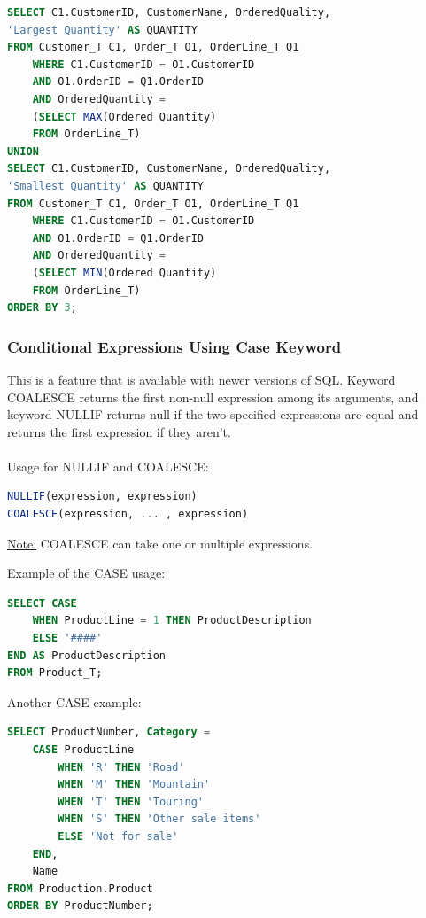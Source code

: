\documentclass[12pt]{article}
\begin{document}
\begin{lstlisting}[language=SQL]
SELECT C1.CustomerID, CustomerName, OrderedQuality, 
'Largest Quantity' AS QUANTITY
FROM Customer_T C1, Order_T O1, OrderLine_T Q1
	WHERE C1.CustomerID = O1.CustomerID
	AND O1.OrderID = Q1.OrderID
	AND OrderedQuantity =
	(SELECT MAX(Ordered Quantity)
	FROM OrderLine_T)
UNION
SELECT C1.CustomerID, CustomerName, OrderedQuality, 
'Smallest Quantity' AS QUANTITY
FROM Customer_T C1, Order_T O1, OrderLine_T Q1
	WHERE C1.CustomerID = O1.CustomerID
	AND O1.OrderID = Q1.OrderID
	AND OrderedQuantity =
	(SELECT MIN(Ordered Quantity)
	FROM OrderLine_T)
ORDER BY 3;
\end{lstlisting}

\subsubsection{Conditional Expressions Using Case Keyword}

This is a feature that is available with newer versions of SQL. Keyword COALESCE returns the first non-null expression among its arguments, and keyword NULLIF returns null if the two specified expressions are equal and returns the first expression if they aren't.\\
\\
Usage for NULLIF and COALESCE:
\begin{lstlisting}[language=SQL]
NULLIF(expression, expression)
COALESCE(expression, ... , expression)
\end{lstlisting}

\begin{tcolorbox}
	\underline{Note:} COALESCE can take one or multiple expressions.
\end{tcolorbox}

Example of the CASE usage:\\
\begin{lstlisting}[language=SQL]
SELECT CASE
	WHEN ProductLine = 1 THEN ProductDescription
	ELSE '####'
END AS ProductDescription
FROM Product_T;
\end{lstlisting}

Another CASE example:\\
\begin{lstlisting}[language=SQL]
SELECT ProductNumber, Category =
	CASE ProductLine
		WHEN 'R' THEN 'Road'
		WHEN 'M' THEN 'Mountain'
		WHEN 'T' THEN 'Touring'
		WHEN 'S' THEN 'Other sale items'
		ELSE 'Not for sale'
	END,
	Name
FROM Production.Product
ORDER BY ProductNumber;
\end{lstlisting}
\end{document}
